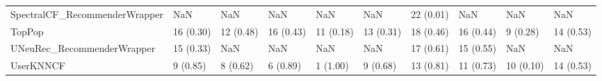 \begin{tabular}{llllllllll}
      SpectralCF\_RecommenderWrapper &                      NaN &         NaN &           NaN &          NaN &                  NaN &           22 (0.01) &               NaN &                NaN &               NaN \\
                             TopPop &                16 (0.30) &   12 (0.48) &     16 (0.43) &    11 (0.18) &            13 (0.31) &           18 (0.46) &         16 (0.44) &           9 (0.28) &         14 (0.53) \\
         UNeuRec\_RecommenderWrapper &                15 (0.33) &         NaN &           NaN &          NaN &                  NaN &           17 (0.61) &         15 (0.55) &                NaN &               NaN \\
                          UserKNNCF &                 9 (0.85) &    8 (0.62) &      6 (0.89) &     1 (1.00) &             9 (0.68) &           13 (0.81) &         11 (0.73) &          10 (0.10) &         14 (0.53) \\
\bottomrule
\end{tabular}

